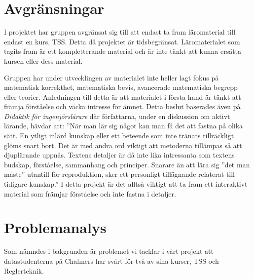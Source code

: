 \documentclass[]{article}
\begin{document}
\section{Avgränsningar}

I projektet har gruppen avgränsat sig till att endast ta fram läromaterial
till endast en kurs, TSS. Detta då projektet är tidsbegränsat.
Läromaterialet som tagits fram är ett kompletterande material och är inte
tänkt att kunna ersätta kursen eller dess material.

Gruppen har under utvecklingen av materialet inte heller lagt fokus på matematisk korrekthet,
matematiska bevis, avancerade matematiska begrepp eller teorier.  Anledningen till detta är att
materialet  i första hand är tänkt att främja förståelse och väcka intresse för ämnet. Detta beslut
baserades även på \textit{Didaktik för ingenjörslärare} där författarna, under en diskussion om aktivt lärande,
hävdar att: ”När man lär sig något kan man få det att fastna på olika sätt. En ytligt inlärd kunskap
eller ett beteende som inte tränats tillräckligt glöms snart bort. Det är med andra ord viktigt att
metoderna tillämpas så att djuplärande uppnås. Textens detaljer är då inte lika intressanta som textens
budskap, förståelse, sammanhang och principer. Snarare än att lära sig ”det man måste” utantill för
reproduktion, sker ett personligt tillägnande relaterat till tidigare kunskap.” I detta projekt är det
alltså viktigt att ta fram ett interaktivt material som främjar förståelse och inte fastna i detaljer.

\section{Problemanalys}


Som nämndes i bakgrunden är problemet vi tacklar i vårt projekt att
datastudenterna på Chalmers har svårt för två av sina kurser,
TSS och Reglerteknik.
\end{document}
